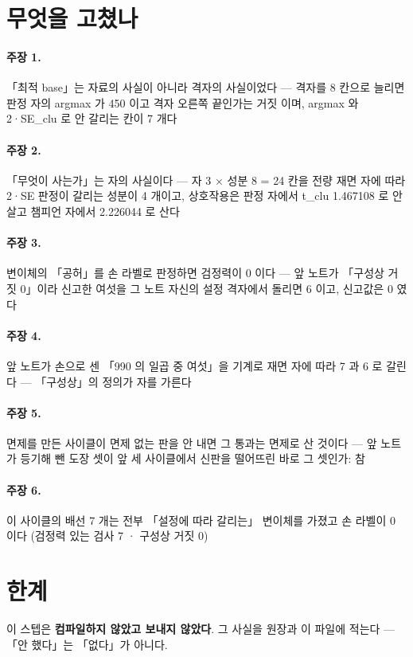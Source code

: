 \section{무엇을 고쳤나}

\paragraph{주장 1.} 「최적 base」는 자료의 사실이 아니라 격자의 사실이었다 --- 격자를 8 칸으로 늘리면 판정 자의 argmax 가 450 이고 격자 오른쪽 끝인가는 거짓 이며, argmax 와 2·SE_clu 로 안 갈리는 칸이 7 개다

\paragraph{주장 2.} 「무엇이 사는가」는 자의 사실이다 --- 자 3 × 성분 8 = 24 칸을 전량 재면 자에 따라 2·SE 판정이 갈리는 성분이 4 개이고, 상호작용은 판정 자에서 t_clu 1.467108 로 안 살고 챔피언 자에서 2.226044 로 산다

\paragraph{주장 3.} 변이체의 「공허」를 손 라벨로 판정하면 검정력이 0 이다 --- 앞 노트가 「구성상 거짓 0」이라 신고한 여섯을 그 노트 자신의 설정 격자에서 돌리면 6 이고, 신고값은 0 였다

\paragraph{주장 4.} 앞 노트가 손으로 센 「990 의 일곱 중 여섯」을 기계로 재면 자에 따라 7 과 6 로 갈린다 --- 「구성상」의 정의가 자를 가른다

\paragraph{주장 5.} 면제를 만든 사이클이 면제 없는 판을 안 내면 그 통과는 면제로 산 것이다 --- 앞 노트가 등기해 뺀 도장 셋이 앞 세 사이클에서 신판을 떨어뜨린 바로 그 셋인가: 참

\paragraph{주장 6.} 이 사이클의 배선 7 개는 전부 「설정에 따라 갈리는」 변이체를 가졌고 손 라벨이 0 이다 (검정력 있는 검사 7 · 구성상 거짓 0)


\section{한계}

이 스텝은 \textbf{컴파일하지 않았고 보내지 않았다}. 그 사실을 원장과 이 파일에 적는다 --- 「안 했다」는 「없다」가 아니다.

